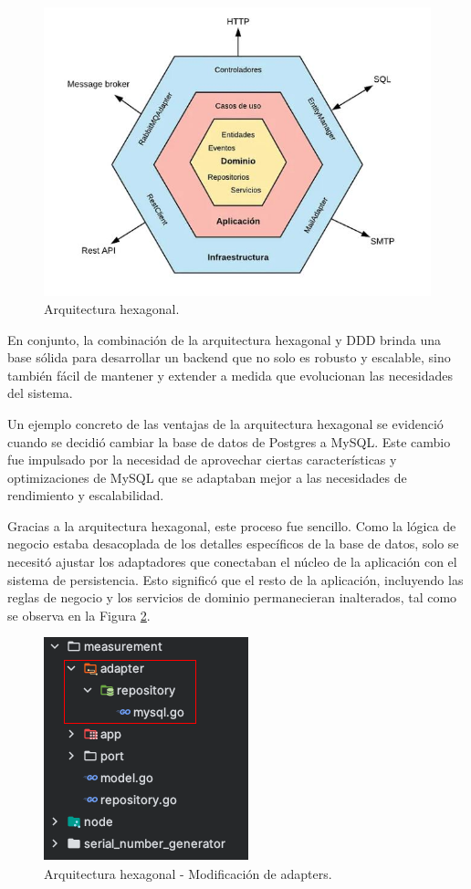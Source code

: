 \begin{figure}[H]
	\centering
	\includegraphics[scale=.5]{./Figures/PortalWeb/Arquitectura-Hexagonal.jpeg}
	\caption{Arquitectura hexagonal.}
	\label{fig:arquitecturahexagonal}
\end{figure}

En conjunto, la combinación de la arquitectura hexagonal y DDD  brinda una base sólida para desarrollar un backend que no solo es robusto y escalable, sino también fácil de mantener y extender a medida que evolucionan las necesidades del sistema. 

Un ejemplo concreto de las ventajas de la arquitectura hexagonal se evidenció cuando se decidió cambiar la base de datos de Postgres a MySQL. Este cambio fue impulsado por la necesidad de aprovechar ciertas características y optimizaciones de MySQL que se adaptaban mejor a las necesidades de rendimiento y escalabilidad.

Gracias a la arquitectura hexagonal, este proceso fue sencillo. Como la lógica de negocio estaba desacoplada de los detalles específicos de la base de datos, solo se necesitó ajustar los adaptadores que conectaban el núcleo de la aplicación con el sistema de persistencia. Esto significó que el resto de la aplicación, incluyendo las reglas de negocio y los servicios de dominio permanecieran inalterados, tal como se observa en la Figura \ref{fig:modifAdapters}. 

\begin{figure}[H]
	\centering
	\includegraphics[scale=.7]{./Figures/PortalWeb/Ej_cambio-adapters.png}
	\caption{Arquitectura hexagonal - Modificación de adapters.}
	\label{fig:modifAdapters}
\end{figure}


